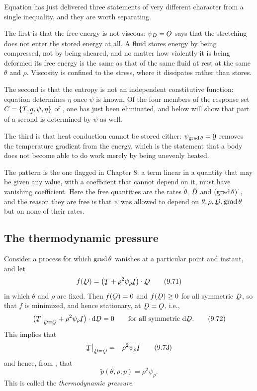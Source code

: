 \begin{remark}
\label{rem:ch9three}
Equation  has just delivered three statements of very
different character from a single inequality, and they are worth
separating.

The first is that the free energy is not viscous: $\psi_{\bD}=\Ob$ says
that the stretching does not enter the stored energy at all. A fluid
stores energy by being compressed, not by being sheared, and no matter
how violently it is being deformed its free energy is the same as that
of the same fluid at rest at the same $\theta$ and $\rho$. Viscosity is
confined to the stress, where it dissipates rather than stores.

The second is that the entropy is not an independent constitutive
function: equation  determines $\eta$ once $\psi$ is known. Of
the four members of the response set $C=\{\bT,\bq,\psi,\eta\}$ of
, one has just been eliminated, and  below will show
that part of a second is determined by $\psi$ as well.

The third is that heat conduction cannot be stored either:
$\psi_{\grad\theta}=\bze$ removes the temperature gradient from the
energy, which is the statement that a body does not become able to do
work merely by being unevenly heated.

The pattern is the one flagged in Chapter 8: a term linear in a
quantity that may be given any value, with a coefficient that cannot
depend on it, must have vanishing coefficient. Here the free quantities
are the rates $\dot\theta$, $\dot\bD$ and
$(\operatorname{grad}\theta)^{\textstyle\cdot}$, and the reason they are free is that
$\psi$ was allowed to depend on $\theta,\rho,\bD,\grad\theta$ but on
none of their rates.
\end{remark}

\subsection*{The thermodynamic pressure}

Consider a process for which $\operatorname{grad}\theta$ vanishes at a particular
point and instant, and let
\begin{equation}
   f(\bD)=\ip{\big(\bT+\rho^{2}\psi_{\rho}\I\big)}\bD
   \tag{9.71}\label{eq:9.71}
\end{equation}
in which $\theta$ and $\rho$ are fixed. Then $f(\Ob)=0$ and
$f(\bD)\geq0$ for all symmetric $\bD$, so that $f$ is minimized, and
hence stationary, at $\bD=\Ob$, i.e.,
\begin{equation}
   \ip{\big(\bT\rest{\bD=\Ob}+\rho^{2}\psi_{\rho}\I\big)}{\dl\bD}=0
   \qquad\text{for all symmetric }\dl\bD .
   \tag{9.72}\label{eq:9.72}
\end{equation}
This implies that
\begin{equation}
   \bT\rest{\bD=\Ob}=-\rho^{2}\psi_{\rho}\I
   \tag{9.73}\label{eq:9.73}
\end{equation}
and hence, from , that
\begin{equation}
   \tilde p(\theta,\rho;p)=\rho^{2}\psi_{\rho}.
   \tag{9.74}\label{eq:9.74}
\end{equation}
This is called the \emph{thermodynamic pressure}.

